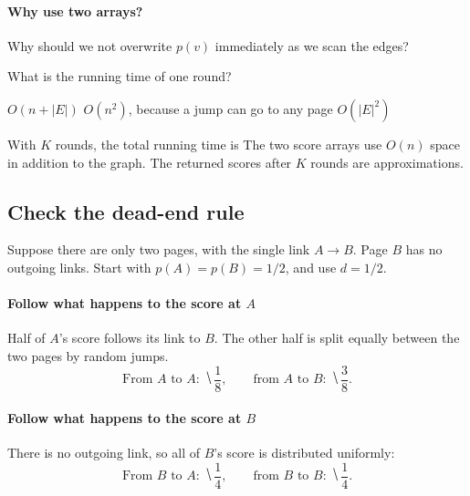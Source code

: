 \documentclass[11pt]{article}
\begin{document}
\paragraph{Why use two arrays?}
Why should we not overwrite $p(v)$ immediately as we scan the edges?
\vs{.7cm}

\begin{Qu}
    What is the running time of one round?
    \begin{itemize}
        \aitem $O(n+|E|)$
        \bitem $O(n^2)$, because a jump can go to any page
        \citem $O(|E|^2)$
    \end{itemize}
\end{Qu}

With $K$ rounds, the total running time is 
The two score arrays use $O(n)$ space in addition to the graph.
The returned scores after $K$ rounds are approximations.

\newpage
\subsection*{Check the dead-end rule}
Suppose there are only two pages, with the single link $A\to B$.
Page $B$ has no outgoing links. Start with $p(A)=p(B)=1/2$, and use $d=1/2$.

\paragraph{Follow what happens to the score at $A$}
Half of $A$'s score follows its link to $B$. The other half is split equally
between the two pages by random jumps.
\begin{equation*}
    \text{From $A$ to $A$: }\hide{\frac18},\qquad
    \text{from $A$ to $B$: }\hide{\frac38}.
\end{equation*}

\paragraph{Follow what happens to the score at $B$}
There is no outgoing link, so all of $B$'s score is distributed uniformly:
\begin{equation*}
    \text{From $B$ to $A$: }\hide{\frac14},\qquad
    \text{from $B$ to $B$: }\hide{\frac14}.
\end{equation*}
\end{document}
